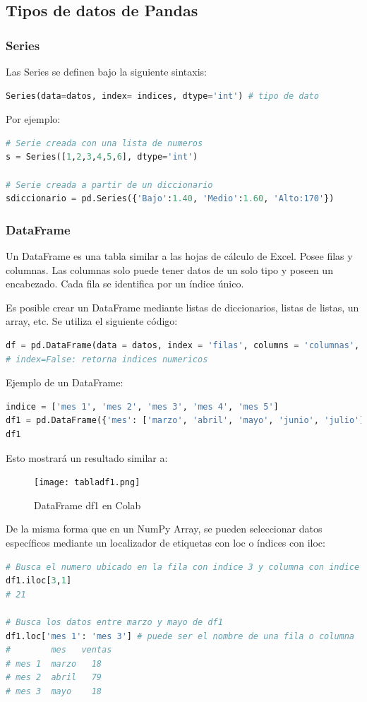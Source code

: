 \documentclass[a4paper, 12pt]{book}
\begin{document}
\subsection{Tipos de datos de Pandas}
\subsubsection{Series}
Las Series se definen bajo la siguiente sintaxis:
\begin{lstlisting}[language=Python]
Series(data=datos, index= indices, dtype='int') # tipo de dato
\end{lstlisting}

Por ejemplo:
\begin{lstlisting}[language=Python]
# Serie creada con una lista de numeros
s = Series([1,2,3,4,5,6], dtype='int')
	
# Serie creada a partir de un diccionario
sdiccionario = pd.Series({'Bajo':1.40, 'Medio':1.60, 'Alto:170'})
\end{lstlisting}

\subsubsection{DataFrame}
Un DataFrame es una tabla similar a las hojas de cálculo de Excel. Posee filas y columnas. Las columnas solo puede tener datos de un solo tipo y poseen un encabezado. Cada fila se identifica por un índice único.

Es posible crear un DataFrame mediante listas de diccionarios, listas de listas, un array, etc. Se utiliza el siguiente código:
\begin{lstlisting}[language=Python]
df = pd.DataFrame(data = datos, index = 'filas', columns = 'columnas', dtype = 'int')
# index=False: retorna indices numericos
\end{lstlisting}

Ejemplo de un DataFrame:
\begin{lstlisting}[language=Python]
indice = ['mes 1', 'mes 2', 'mes 3', 'mes 4', 'mes 5']
df1 = pd.DataFrame({'mes': ['marzo', 'abril', 'mayo', 'junio', 'julio'], 'ventas': np.random.randint(1,100, 5)}, index = indice)
df1
\end{lstlisting}
Esto mostrará un resultado similar a:
\begin{figure}[H] 
	\centering 
	\texttt{[image: tabladf1.png]}
	\caption{DataFrame df1 en Colab}
\end{figure}

De la misma forma que en un NumPy Array, se pueden seleccionar datos específicos mediante un localizador de etiquetas con loc o índices con iloc:
\begin{lstlisting}[language=Python]
# Busca el numero ubicado en la fila con indice 3 y columna con indice 1
df1.iloc[3,1]
# 21
	
# Busca los datos entre marzo y mayo de df1
df1.loc['mes 1': 'mes 3'] # puede ser el nombre de una fila o columna
#        mes   ventas
# mes 1  marzo   18
# mes 2  abril   79
# mes 3  mayo    18
\end{lstlisting}
\end{document}
